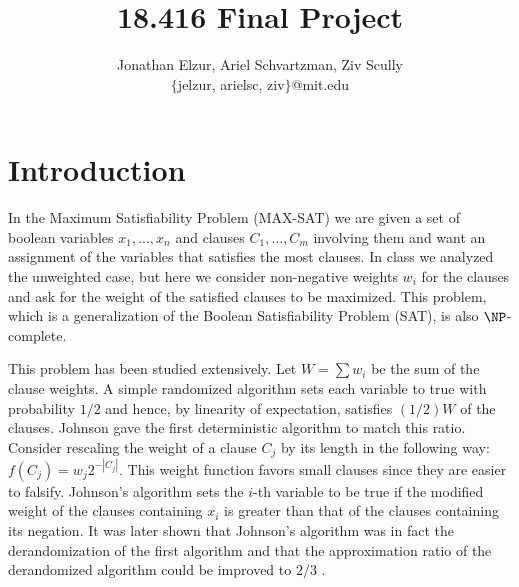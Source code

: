 \documentclass[11pt,letter]{article}
\begin{document}


\title{18.416 Final Project}

\author{Jonathan Elzur, Ariel Schvartzman, Ziv Scully \\ $\{$jelzur, arielsc, ziv$\}$@mit.edu}

\maketitle

\section{Introduction}

In the Maximum Satisfiability Problem (MAX-SAT) we are given a set of boolean variables $x_1, ..., x_n$
and clauses $C_1,...,C_m$ involving them and want an assignment of the variables that satisfies the most clauses.
In class we analyzed the unweighted case, but here we consider non-negative weights $w_i$ for the clauses
and ask for the weight of the satisfied clauses to be maximized. This problem, which is a generalization of the
Boolean Satisfiability Problem (SAT), is also $\NP$-complete.

This problem has been studied extensively. Let $W = \sum w_i$ be the sum of the clause weights.
A simple randomized algorithm sets each variable to true with probability $1/2$ and hence,
by linearity of expectation, satisfies $(1/2)W$ of the clauses. Johnson \cite{Johnson1974256}
gave the first deterministic algorithm to match this ratio. Consider rescaling the weight of a clause $C_j$
by its length in the following way: $f(C_j) = w_j 2^{-|C_j|}$. This weight function favors small clauses
since they are easier to falsify. Johnson's algorithm sets the $i$-th variable to be true
if the modified weight of the clauses containing $x_i$ is greater than that of the clauses containing its negation.
It was later shown that Johnson's algorithm was in fact the derandomization of the first algorithm and that the
approximation ratio of the derandomized algorithm could be improved to $2/3$ \cite{Chen1999622}.
\end{document}

